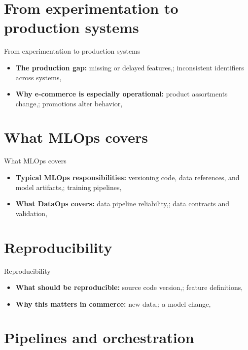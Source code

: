 \documentclass[aspectratio=169]{beamer}
\begin{document}
\section{From experimentation to production systems}

\begin{frame}{From experimentation to production systems}
  \begin{itemize}
    \item \textbf{The production gap:} missing or delayed features,; inconsistent identifiers across systems,
    \item \textbf{Why e-commerce is especially operational:} product assortments change,; promotions alter behavior,
  \end{itemize}
\end{frame}

\section{What MLOps covers}

\begin{frame}{What MLOps covers}
  \begin{itemize}
    \item \textbf{Typical MLOps responsibilities:} versioning code, data references, and model artifacts,; training pipelines,
    \item \textbf{What DataOps covers:} data pipeline reliability,; data contracts and validation,
  \end{itemize}
\end{frame}

\section{Reproducibility}

\begin{frame}{Reproducibility}
  \begin{itemize}
    \item \textbf{What should be reproducible:} source code version,; feature definitions,
    \item \textbf{Why this matters in commerce:} new data,; a model change,
  \end{itemize}
\end{frame}

\section{Pipelines and orchestration}
\end{document}
